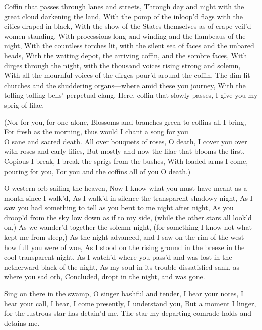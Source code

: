 \documentclass[11pt]{book}
\newenvironment {poem} [1]
 {\titulus{#1}%
  \versus
  \Nstanza{0}%
  \numerus{1}}
 {\endversus}
\begin{document}
\begin{poem}{When Lilacs Last in the Dooryard Bloom'd}
\stropha %

Coffin that passes through lanes and streets,
Through day and night with the great cloud darkening the land,
With the pomp of the inloop'd flags with the cities draped in black,
With the show of the States themselves as of crape-veil'd women standing,
With processions long and winding and the flambeaus of the night,
With the countless torches lit, with the silent sea of faces and the %
    unbared heads,
With the waiting depot, the arriving coffin, and the sombre faces,
With dirges through the night, with the thousand voices rising strong %
    and solemn,
With all the mournful voices of the dirges pour'd around the coffin,
The dim-lit churches and the shuddering organs---where amid these %
    you journey,
With the tolling tolling bells' perpetual clang,
Here, coffin that slowly passes,
I give you my sprig of lilac.

\stropha %

(Nor for you, for one alone,
Blossoms and branches green to coffins all I bring,
For fresh as the morning, thus would I chant a song for you \\O sane %
    and sacred death.
     \vacua
All over bouquets of roses,
O death, I cover you over with roses and early lilies,
But mostly and now the lilac that blooms the first,
Copious I break, I break the sprigs from the bushes,
With loaded arms I come, pouring for you,
For you and the coffins all of you O death.)

\stropha %

O western orb sailing the heaven,
Now I know what you must have meant as a month since I walk'd,
As I walk'd in silence the transparent shadowy night,
As I saw you had something to tell as you bent to me night after night,
As you droop'd from the sky low down as if to my side, (while the %
    other stars all look'd on,)
As we wander'd together the solemn night, (for something I know not %
    what kept me from sleep,)
As the night advanced, and I saw on the rim of the west how full you %
    were of woe,
As I stood on the rising ground in the breeze in the cool transparent night,
As I watch'd where you pass'd and was lost in the netherward black %
    of the night,
As my soul in its trouble dissatisfied sank, as where you sad orb,
Concluded, dropt in the night, and was gone.

\stropha %

Sing on there in the swamp,
O singer bashful and tender, I hear your notes, I hear your call,
I hear, I come presently, I understand you,
But a moment I linger, for the lustrous star has detain'd me,
The star my departing comrade holds and detains me.


\end{poem}
\end{document}
